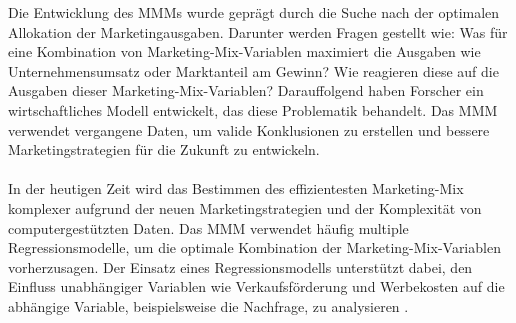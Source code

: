 Die Entwicklung des \ac{MMM}s wurde geprägt durch die Suche nach der optimalen Allokation der Marketingausgaben. Darunter werden Fragen gestellt wie: Was für eine Kombination von Marketing-Mix-Variablen maximiert die Ausgaben wie Unternehmensumsatz oder Marktanteil am Gewinn? Wie reagieren diese auf die Ausgaben dieser Marketing-Mix-Variablen? Darauffolgend haben Forscher ein wirtschaftliches Modell entwickelt, das diese Problematik behandelt. Das \ac{MMM} verwendet vergangene Daten, um valide Konklusionen zu erstellen und bessere Marketingstrategien für die Zukunft zu entwickeln.\\\\
In der heutigen Zeit wird das Bestimmen des effizientesten Marketing-Mix komplexer aufgrund der neuen Marketingstrategien und der Komplexität von computergestützten Daten. Das \ac{MMM} verwendet häufig multiple Regressionsmodelle, um die optimale Kombination der Marketing-Mix-Variablen vorherzusagen. Der Einsatz eines Regressionsmodells unterstützt dabei, den Einfluss unabhängiger Variablen wie Verkaufsförderung und Werbekosten auf die abhängige Variable, beispielsweise die Nachfrage, zu analysieren \cite{akinkunmi2018data}.\\\\
